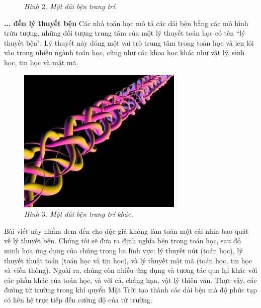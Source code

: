 \begin{multicols}{2}
\begin{figure}[H]
		\caption{\small\textit{\color{duongvaotoanhoc}Hình $2$. Một dải bện trang trí.}}
		\vspace*{-10pt}
	\end{figure}
	\textbf{\color{duongvaotoanhoc}... đến lý thuyết bện}
	\vskip 0.1cm
	Các nhà toán học mô tả các dải bện bằng các mô hình trừu tượng, những đối tượng trung tâm của một lý thuyết toán học có tên ``lý thuyết bện". Lý thuyết này đóng một vai trò trung tâm trong toán học và len lỏi vào trong nhiều ngành toán học, cũng như các khoa học khác như vật lý, sinh học, tin học và mật mã.
	\begin{figure}[H]
		\vspace*{-5pt}
		\centering
		\captionsetup{labelformat= empty, justification=centering}
		\includegraphics[width= 1\linewidth]{fig_03a}
		\caption{\small\textit{\color{duongvaotoanhoc}Hình $3$. Một dải bện trang trí khác.}}
		\vspace*{-10pt}
	\end{figure}
	Bài viết này nhằm đem đến cho độc giả không làm toán một cái nhìn bao quát về lý thuyết bện. Chúng tôi sẽ đưa ra định nghĩa bện trong toán học, sau đó minh họa ứng dụng của chúng trong ba lĩnh vực: lý thuyết nút (toán học), lý thuyết thuật toán (toán học và tin học), và lý thuyết mật mã (toán học, tin học và viễn thông). Ngoài ra, chúng còn nhiều ứng dụng và tương tác qua lại khác với các phần khác của toán học, và với cả, chẳng hạn, vật lý thiên văn. Thực vậy, các đường từ trường trong khí quyển Mặt Trời tạo thành các dải bện mà độ phức tạp có liên hệ trực tiếp đến cường độ của từ trường.

\end{multicols}
